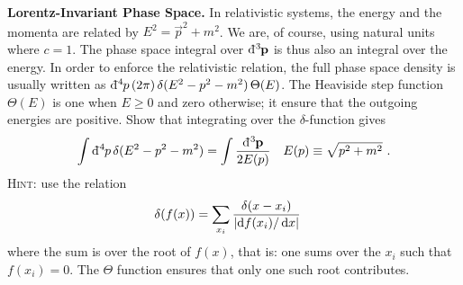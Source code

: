\begin{subappendices}
\begin{exercise}\textbf{Lorentz-Invariant Phase Space.}
In relativistic systems, the energy and the momenta are related by $E^2 = \vec{p}^2 + m^2$. We are, of course, using natural units where $c=1$. The phase space integral over $\DDbar{3}{\vec{p}}$ is thus also an integral over the energy. In order to enforce the relativistic relation, the full phase space density is usually written as $\DDbar{4}{p}\, (2\pi)\,\delta(E^2-p^2-m^2)\,\Theta(E)$. The Heaviside step function $\Theta(E)$ is one when $E\geq 0$ and zero otherwise; it ensure that the outgoing energies are positive. Show that integrating over the $\delta$-function gives
\begin{align}
  \int \DDbar{4}{p}\, \delta(E^2-p^2-m^2) &= 
  \int \frac{\DDbar{3}{\vec{p}}}{2E(p)}
  &
  E(p) \equiv \sqrt{p^2 + m^2} \ .
\end{align}
\textsc{Hint}: use the relation
\begin{align}
    \delta(f(x)) &= \sum_{x_i} \frac{\delta(x-x_i)}{\left|\operatorname{d}\mkern-3mu^{}\mkern-1mu{f}(x_i)/\operatorname{d}\mkern-3mu^{}\mkern-1mu{x}\right|}
\end{align}
where the sum is over the root of $f(x)$, that is: one sums over the $x_i$ such that $f(x_i)=0$. The $\Theta$ function ensures that only one such root contributes.
\end{exercise}

\end{subappendices}
